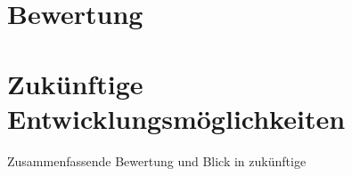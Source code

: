 \chapter{Bewertung}



\chapter{Zukünftige Entwicklungsmöglichkeiten}

Zusammenfassende Bewertung und Blick in zukünftige
    
